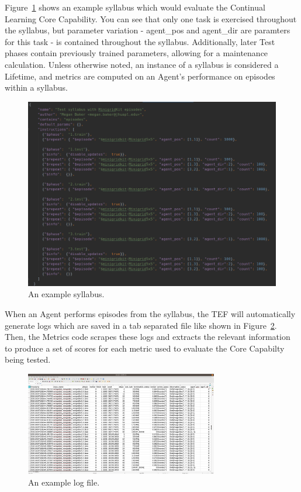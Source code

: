 Figure~\ref{fig:syllabus} shows an example syllabus which would evaluate the Continual Learning Core Capability. You can see that only one task is exercised throughout the syllabus, but parameter variation - agent\_pos and agent\_dir are paramters for this task - is contained throughout the syllabus. Additionally, later Test phases contain previously trained parameters, allowing for a maintenance calculation. Unless otherwise noted, an instance of a syllabus is considered a Lifetime, and metrics are computed on an Agent's performance on episodes within a syllabus.

\pagebreak
\begin{figure}[h]
	\centering
	\includegraphics[width=0.75\columnwidth]{sections/figs/syllabus.png}
	\caption{An example syllabus.}
	\label{fig:syllabus}
\end{figure}



When an Agent performs episodes from the syllabus, the TEF will automatically generate logs which are saved in a tab separated file like shown in Figure~\ref{fig:logfile}. Then, the Metrics code scrapes these logs and extracts the relevant information to produce a set of scores for each metric used to evaluate the Core Capabilty being tested.\\



\begin{figure}[h]
	\centering
	\includegraphics[width=0.75\textwidth]{sections/figs/log_file.png}
	\caption{An example log file.}
	\label{fig:logfile}
\end{figure}


